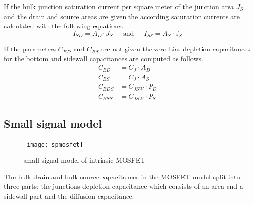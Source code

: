 \documentclass[10pt]{report}
\begin{document}
If the bulk junction saturation current per square meter of the
junction area $J_S$ and the drain and source areas are given the
according saturation currents are calculated with the following
equations.
\begin{equation}
I_{SD} = A_{D}\cdot J_{S}
\;\;\;\; \textrm{ and } \;\;\;\;
I_{SS} = A_{S}\cdot J_{S}
\end{equation}

If the parameters $C_{BD}$ and $C_{BS}$ are not given the zero-bias
depletion capacitances for the bottom and sidewall capacitances are
computed as follows.
\begin{align}
C_{BD} &= C_{J}\cdot A_D\\
C_{BS} &= C_{J}\cdot A_S\\
C_{BDS} &= C_{JSW}\cdot P_D\\
C_{BSS} &= C_{JSW}\cdot P_S
\end{align}

\subsection{Small signal model}

\begin{figure}[ht]
\begin{center}
\texttt{[image: spmosfet]}
\end{center}
\caption{small signal model of intrinsic MOSFET}
\label{fig:spmosfet}
\end{figure}
\FloatBarrier

The bulk-drain and bulk-source capacitances in the MOSFET model split
into three parts: the junctions depletion capacitance which consists
of an area and a sidewall part and the diffusion capacitance.
\end{document}

